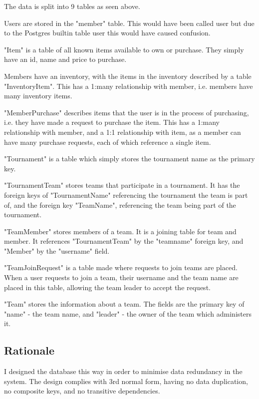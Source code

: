 
The data is split into 9 tables as seen above.

Users are stored in the "member" table. This would have been called user but due to the Postgres builtin table user this would have caused confusion.

"Item" is a table of all known items available to own or purchase. They simply have an id, name and price to purchase.

Members have an inventory, with the items in the inventory described by a table "InventoryItem". This has a 1:many relationship with member, i.e. members have many inventory items.

"MemberPurchase" describes items that the user is in the process of purchasing, i.e. they have made a request to purchase the item. This has a 1:many relationship with member, and a 1:1 relationship with item, as a member can have many purchase requests, each of which reference a single item.

"Tournament" is a table which simply stores the tournament name as the primary key.

"TournamentTeam" stores teams that participate in a tournament. It has the foreign keys of "TournamentName" referencing the tournament the team is part of, and the foreign key "TeamName", referencing the team being part of the tournament.

"TeamMember" stores members of a team. It is a joining table for team and member. It references "TournamentTeam" by the "teamname" foreign key, and "Member" by the "username" field.

"TeamJoinRequest" is a table made where requests to join teams are placed. When a user requests to join a team, their username and the team name are placed in this table, allowing the team leader to accept the request.

"Team" stores the information about a team. The fields are the primary key of "name" - the team name, and "leader" - the owner of the team which administers it.

\subsection{Rationale}

I designed the database this way in order to minimise data redundancy in the system. The design complies with 3rd normal form, having no data duplication, no composite keys, and no transitive dependencies. 

